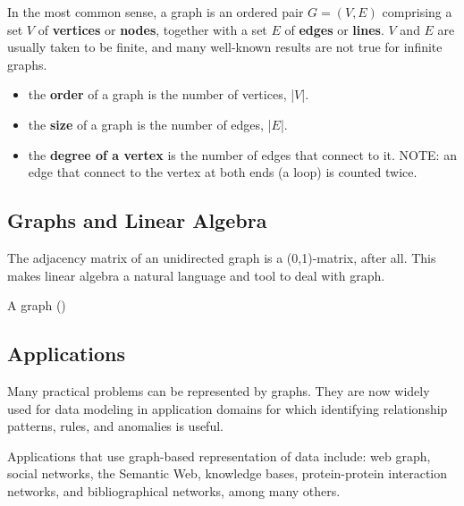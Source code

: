 In the most common sense, a graph is an ordered pair $G=(V,E)$ comprising a set $V$ 
of {\bf vertices} or {\bf nodes}, together with a set $E$ of {\bf edges} or {\bf lines}.
$V$ and $E$ are usually taken to be finite, and many well-known results are not true for infinite graphs.
\begin{itemize}
  \item the {\bf order} of a graph is the number of vertices, |$V$|.
  \item the {\bf size} of a graph is the number of edges, |$E$|.
  \item the {\bf degree of a vertex} is the number of edges that connect to it. NOTE:
  an edge that connect to the vertex at both ends (a loop) is counted twice.
\end{itemize}

\subsection{Graphs and Linear Algebra}

The adjacency matrix of an unidirected graph is a (0,1)-matrix, after all. This
makes linear algebra a natural language and tool to deal with graph.

A graph ()

\subsection{Applications}

Many practical problems can be represented by graphs.
They are now widely used for data modeling in application domains for which
identifying relationship patterns, rules, and anomalies is useful.

Applications that use graph-based representation of data include:
web graph, social networks, the Semantic Web, knowledge bases, protein-protein
interaction networks, and bibliographical networks, among many others.

